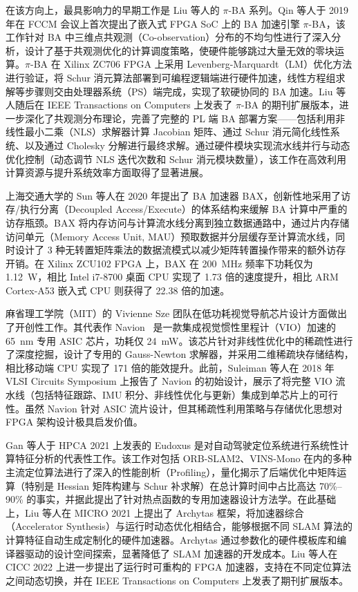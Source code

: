在该方向上，最具影响力的早期工作是 Liu 等人的 $\pi$-BA 系列。Qin 等人\cite{qin2019piba}于 2019 年在 FCCM 会议上首次提出了嵌入式 FPGA SoC 上的 BA 加速引擎 $\pi$-BA，该工作针对 BA 中三维点共观测（Co-observation）分布的不均匀性进行了深入分析，设计了基于共观测优化的计算调度策略，使硬件能够跳过大量无效的零块运算。$\pi$-BA 在 Xilinx ZC706 FPGA 上采用 Levenberg-Marquardt（LM）优化方法进行验证，将 Schur 消元算法部署到可编程逻辑端进行硬件加速，线性方程组求解等步骤则交由处理器系统（PS）端完成，实现了软硬协同的 BA 加速。Liu 等人\cite{liu2020pi}随后在 IEEE Transactions on Computers 上发表了 $\pi$-BA 的期刊扩展版本，进一步深化了共观测分布理论，完善了完整的 PL 端 BA 部署方案——包括利用非线性最小二乘（NLS）求解器计算 Jacobian 矩阵、通过 Schur 消元简化线性系统、以及通过 Cholesky 分解进行最终求解。通过硬件模块实现流水线并行与动态优化控制（动态调节 NLS 迭代次数和 Schur 消元模块数量），该工作在高效利用计算资源与提升系统效率方面取得了显著进展。

上海交通大学的 Sun 等人\cite{sun2020bax}在 2020 年提出了 BA 加速器 BAX，创新性地采用了访存/执行分离（Decoupled Access/Execute）的体系结构来缓解 BA 计算中严重的访存瓶颈。BAX 将内存访问与计算流水线分离到独立数据通路中，通过片内存储访问单元（Memory Access Unit, MAU）预取数据并分层缓存至计算流水线，同时设计了 3 种无转置矩阵乘法的数据流模式以减少矩阵转置操作带来的额外访存开销。在 Xilinx ZCU102 FPGA 上，BAX 在 200~MHz 频率下功耗仅为 1.12~W，相比 Intel i7-8700 桌面 CPU 实现了 1.73 倍的速度提升，相比 ARM Cortex-A53 嵌入式 CPU 则获得了 22.38 倍的加速。

麻省理工学院（MIT）的 Vivienne Sze 团队在低功耗视觉导航芯片设计方面做出了开创性工作。其代表作 Navion~\cite{suleiman2019navion} 是一款集成视觉惯性里程计（VIO）加速的 65~nm 专用 ASIC 芯片，功耗仅 24~mW。该芯片针对非线性优化中的稀疏性进行了深度挖掘，设计了专用的 Gauss-Newton 求解器，并采用二维稀疏块存储结构，相比移动端 CPU 实现了 171 倍的能效提升。此前，Suleiman 等人\cite{suleiman2018navion}在 2018 年 VLSI Circuits Symposium 上报告了 Navion 的初始设计，展示了将完整 VIO 流水线（包括特征跟踪、IMU 积分、非线性优化与更新）集成到单芯片上的可行性。虽然 Navion 针对 ASIC 流片设计，但其稀疏性利用策略与存储优化思想对 FPGA 架构设计极具启发价值。

Gan 等人\cite{gan2021eudoxus}于 HPCA 2021 上发表的 Eudoxus 是对自动驾驶定位系统进行系统性计算特征分析的代表性工作。该工作对包括 ORB-SLAM2、VINS-Mono 在内的多种主流定位算法进行了深入的性能剖析（Profiling），量化揭示了后端优化中矩阵运算（特别是 Hessian 矩阵构建与 Schur 补求解）在总计算时间中占比高达 70\%--90\% 的事实，并据此提出了针对热点函数的专用加速器设计方法学。在此基础上，Liu 等人\cite{liu2021archytas}在 MICRO 2021 上提出了 Archytas 框架，将加速器综合（Accelerator Synthesis）与运行时动态优化相结合，能够根据不同 SLAM 算法的计算特征自动生成定制化的硬件加速器。Archytas 通过参数化的硬件模板库和编译器驱动的设计空间探索，显著降低了 SLAM 加速器的开发成本。Liu 等人\cite{liu2022cicc}在 CICC 2022 上进一步提出了运行时可重构的 FPGA 加速器，支持在不同定位算法之间动态切换，并在 IEEE Transactions on Computers\cite{liu2022reconfig} 上发表了期刊扩展版本。

